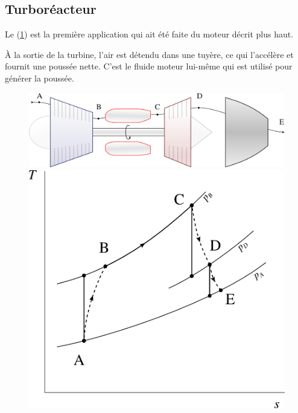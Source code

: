 {{	\subsection{Turboréacteur}

		Le  (\cref{fig_turboréacteur}) est la première application qui ait été faite du moteur décrit plus haut. 

		À la sortie de la turbine, l’air est détendu dans une tuyère, ce qui l’accélère et fournit une poussée nette. C’est le fluide moteur lui-même qui est utilisé pour générer la poussée.

		\begin{figure}
		 	\begin{center}
				\includegraphics[scale=0.6]{images/circuit_turbojet.png}\vspace{0.5cm}
				\includegraphics[scale=0.8]{images/ts_gp_turbojet.png}
			\end{center}
			\label{fig_turboréacteur}
		\end{figure}

}}
